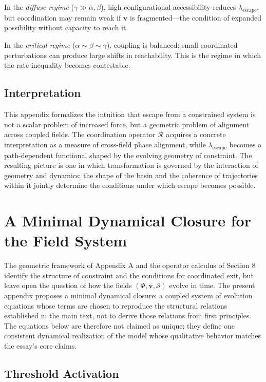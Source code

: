 \documentclass[11pt, a4paper]{article}
\begin{document}
In the \emph{diffuse regime} ($\gamma \gg \alpha, \beta$), high configurational accessibility reduces $\lambda_{\mathrm{escape}}$, but coordination may remain weak if $\mathbf{v}$ is fragmented---the condition of expanded possibility without capacity to reach it.

In the \emph{critical regime} ($\alpha \sim \beta \sim \gamma$), coupling is balanced; small coordinated perturbations can produce large shifts in reachability. This is the regime in which the rate inequality becomes contestable.

\subsection{Interpretation}

This appendix formalizes the intuition that escape from a constrained system is not a scalar problem of increased force, but a geometric problem of alignment across coupled fields. The coordination operator $\mathcal{R}$ acquires a concrete interpretation as a measure of cross-field phase alignment, while $\lambda_{\mathrm{escape}}$ becomes a path-dependent functional shaped by the evolving geometry of constraint. The resulting picture is one in which transformation is governed by the interaction of geometry and dynamics: the shape of the basin and the coherence of trajectories within it jointly determine the conditions under which escape becomes possible.


\section{A Minimal Dynamical Closure for the Field System}

The geometric framework of Appendix A and the operator calculus of Section 8 identify the structure of constraint and the conditions for coordinated exit, but leave open the question of how the fields $(\Phi, \mathbf{v}, \mathcal{S})$ evolve in time. The present appendix proposes a minimal dynamical closure: a coupled system of evolution equations whose terms are chosen to reproduce the structural relations established in the main text, not to derive those relations from first principles. The equations below are therefore not claimed as unique; they define one consistent dynamical realization of the model whose qualitative behavior matches the essay's core claims.

\subsection{Threshold Activation}
\end{document}

